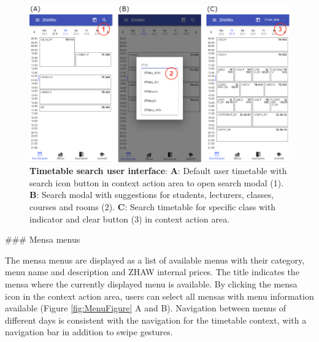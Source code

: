 \begin{markdown}
\begin{figure}[H]
  \includegraphics[width=16cm, center]{./figures/timetable_figure2.png}
  \captionsetup{width=15.5cm}
  \caption[Timetable search user interface]{\textbf{Timetable search user interface}: \textbf{A}: Default user timetable with search icon button in context action area to open search modal (1). \textbf{B}: Search modal with suggestions for students, lecturers, classes, courses and rooms (2). \textbf{C}: Search timetable for specific class with indicator and clear button (3) in context action area.}
  \label{fig:TimetableFigure2}
\end{figure}

\newpage

### Mensa menus

The mensa menus are displayed as a list of available menus with their category, menu name and description and ZHAW internal prices. The title indicates the mensa where the currently displayed menu is available. By clicking the mensa icon in the context action area, users can select all mensas with menu information available (Figure \ref{fig:MenuFigure} A and B). Navigation between menus of different days is consistent with the navigation for the timetable context, with a navigation bar in addition to swipe gestures.

\bigskip


\end{markdown}
